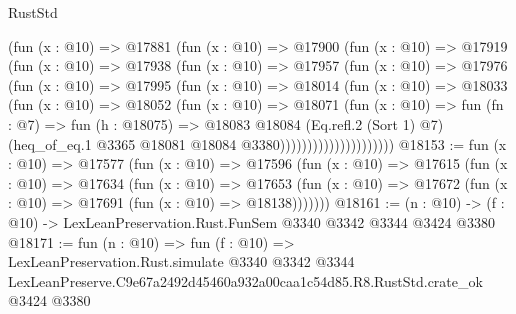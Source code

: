 \begin{lexlean}{RustStd}
\begin{coremodule}
                    (fun (x : @10) =>
                    @17881
                      (fun (x : @10) =>
                      @17900
                        (fun (x : @10) =>
                        @17919
                          (fun (x : @10) =>
                          @17938
                            (fun (x : @10) =>
                            @17957
                              (fun (x : @10) =>
                              @17976
                                (fun (x : @10) =>
                                @17995
                                  (fun (x : @10) =>
                                  @18014
                                    (fun (x : @10) =>
                                    @18033
                                      (fun (x : @10) =>
                                      @18052
                                        (fun (x : @10) =>
                                        @18071
                                          (fun (x : @10) =>
                                          fun (fn : @7) =>
                                          fun (h : @18075) =>
                                          @18083
                                            @18084
                                            (Eq.refl.{2} (Sort 1) @7)
                                            (heq_of_eq.{1}
                                              @3365
                                              @18081
                                              @18084
                                              @3380)))))))))))))))))))))
@18153 := fun (x : @10) =>
  @17577
    (fun (x : @10) =>
    @17596
      (fun (x : @10) =>
      @17615
        (fun (x : @10) =>
        @17634
          (fun (x : @10) =>
          @17653 (fun (x : @10) => @17672 (fun (x : @10) => @17691 (fun (x : @10) => @18138)))))))
@18161 := (n : @10) -> (f : @10) -> LexLeanPreservation.Rust.FunSem @3340 @3342 @3344 @3424 @3380
@18171 := fun (n : @10) =>
  fun (f : @10) =>
  LexLeanPreservation.Rust.simulate
    @3340
    @3342
    @3344
    LexLeanPreserve.C9e67a2492d45460a932a00caa1c54d85.R8.RustStd.crate_ok
    @3424
    @3380
\end{coremodule}
\end{lexlean}
